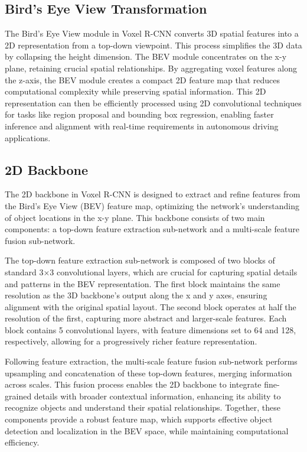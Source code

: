 \subsection{Bird's Eye View Transformation}
The Bird's Eye View module in Voxel R-CNN converts 3D spatial features into a 2D representation from a top-down viewpoint. This process simplifies the 3D data by collapsing the height dimension. The BEV module concentrates on the x-y plane, retaining crucial spatial relationships. By aggregating voxel features along the z-axis, the BEV module creates a compact 2D feature map that reduces computational complexity while preserving spatial information. This 2D representation can then be efficiently processed using 2D convolutional techniques for tasks like region proposal and bounding box regression, enabling faster inference and alignment with real-time requirements in autonomous driving applications.

\subsection{2D Backbone}
The 2D backbone in Voxel R-CNN is designed to extract and refine features from the Bird’s Eye View (BEV) feature map, optimizing the network’s understanding of object locations in the x-y plane. This backbone consists of two main components: a top-down feature extraction sub-network and a multi-scale feature fusion sub-network.

The top-down feature extraction sub-network is composed of two blocks of standard 3×3 convolutional layers, which are crucial for capturing spatial details and patterns in the BEV representation. The first block maintains the same resolution as the 3D backbone’s output along the x and y axes, ensuring alignment with the original spatial layout. The second block operates at half the resolution of the first, capturing more abstract and larger-scale features. Each block contains 5 convolutional layers, with feature dimensions set to 64 and 128, respectively, allowing for a progressively richer feature representation.

Following feature extraction, the multi-scale feature fusion sub-network performs upsampling and concatenation of these top-down features, merging information across scales. This fusion process enables the 2D backbone to integrate fine-grained details with broader contextual information, enhancing its ability to recognize objects and understand their spatial relationships. Together, these components provide a robust feature map, which supports effective object detection and localization in the BEV space, while maintaining computational efficiency.



